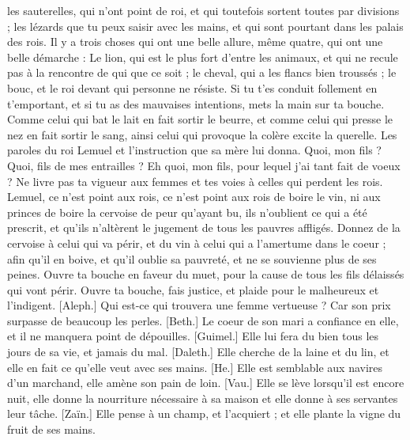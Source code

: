 \begin{multicols}{2}
les sauterelles, qui n'ont point de roi, et qui toutefois sortent toutes par divisions ;
les lézards que tu peux saisir avec les mains, et qui sont pourtant dans les palais des rois.
Il y a trois choses qui ont une belle allure, même quatre, qui ont une belle démarche :
Le lion, qui est le plus fort d'entre les animaux, et qui ne recule pas à la rencontre de qui que ce soit ;
le cheval, qui a les flancs bien troussés ; le bouc, et le roi devant qui personne ne résiste.
Si tu t’es conduit follement en t’emportant, et si tu as des mauvaises intentions, mets la main sur ta bouche.
Comme celui qui bat le lait en fait sortir le beurre, et comme celui qui presse le nez en fait sortir le sang, ainsi celui qui provoque la colère excite la querelle.
\VerseOne{}Les paroles du roi Lemuel et l'instruction que sa mère lui donna.
Quoi, mon fils ? Quoi, fils de mes entrailles ? Eh quoi, mon fils, pour lequel j'ai tant fait de voeux ?
Ne livre pas ta vigueur aux femmes et tes voies à celles qui perdent les rois.
Lemuel, ce n'est point aux rois, ce n'est point aux rois de boire le vin, ni aux princes de boire la cervoise
de peur qu'ayant bu, ils n'oublient ce qui a été prescrit, et qu'ils n'altèrent le jugement de tous les pauvres affligés.
Donnez de la cervoise à celui qui va périr, et du vin à celui qui a l'amertume dans le coeur ;
afin qu'il en boive, et qu'il oublie sa pauvreté, et ne se souvienne plus de ses peines.
Ouvre ta bouche en faveur du muet, pour la cause de tous les fils délaissés qui vont périr.
Ouvre ta bouche, fais justice, et plaide pour le malheureux et l’indigent.
[Aleph.] Qui est-ce qui trouvera une femme vertueuse ? Car son prix surpasse de beaucoup les perles.
[Beth.] Le coeur de son mari a confiance en elle, et il ne manquera point de dépouilles.
[Guimel.] Elle lui fera du bien tous les jours de sa vie, et jamais du mal.
[Daleth.] Elle cherche de la laine et du lin, et elle en fait ce qu'elle veut avec ses mains.
[He.] Elle est semblable aux navires d'un marchand, elle amène son pain de loin.
[Vau.] Elle se lève lorsqu'il est encore nuit, elle donne la nourriture nécessaire à sa maison et elle donne à ses servantes leur tâche.
[Zaïn.] Elle pense à un champ, et l'acquiert ; et elle plante la vigne du fruit de ses mains.

\end{multicols}
